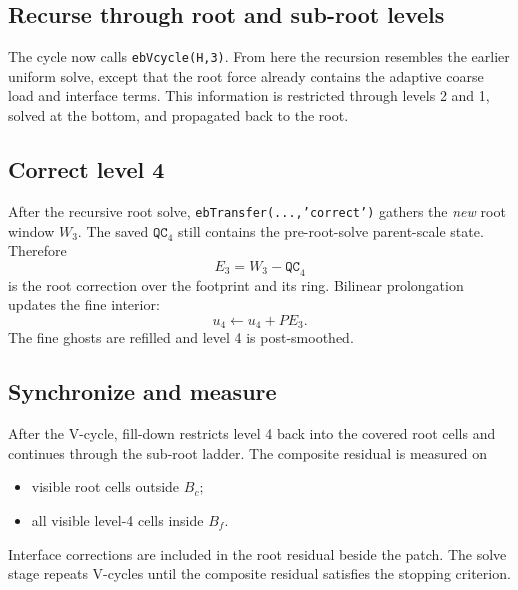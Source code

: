 \documentclass[11pt,oneside,openany]{book}
\newcommand{\code}[1]{\textnormal{\texttt{#1}}}
\begin{document}
\subsection{Recurse through root and sub-root levels}
The cycle now calls \code{ebVcycle(H,3)}. From here the recursion resembles the earlier uniform solve, except that the root force already contains the adaptive coarse load and interface terms. This information is restricted through levels 2 and 1, solved at the bottom, and propagated back to the root.

\subsection{Correct level 4}
After the recursive root solve, \code{ebTransfer(...,'correct')} gathers the \emph{new} root window $W_3$. The saved \ensuremath{\mathtt{QC}_{4}} still contains the pre-root-solve parent-scale state. Therefore
\[
 E_3=W_3-\ensuremath{\mathtt{QC}_{4}}
\]
is the root correction over the footprint and its ring. Bilinear prolongation updates the fine interior:
\[
 u_4\leftarrow u_4+PE_3.
\]
The fine ghosts are refilled and level 4 is post-smoothed.

\subsection{Synchronize and measure}
After the V-cycle, fill-down restricts level 4 back into the covered root cells and continues through the sub-root ladder. The composite residual is measured on
\begin{itemize}
\item visible root cells outside $B_c$;
\item all visible level-4 cells inside $B_f$.
\end{itemize}
Interface corrections are included in the root residual beside the patch. The solve stage repeats V-cycles until the composite residual satisfies the stopping criterion.
\end{document}
